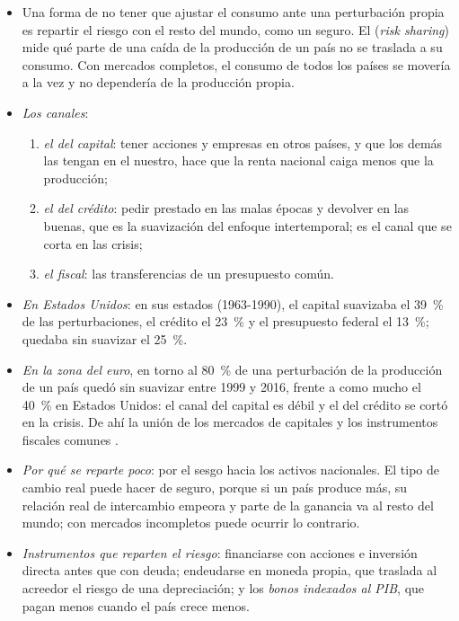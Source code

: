 \documentclass[11pt]{article}
\begin{document}
\begin{itemize}
\item Una forma de no tener que ajustar el consumo ante una perturbación propia es repartir el riesgo con el resto del mundo, como un seguro. El  (\emph{risk sharing}) mide qué parte de una caída de la producción de un país no se traslada a su consumo. Con mercados completos, el consumo de todos los países se movería a la vez y no dependería de la producción propia.
\item \emph{Los canales}\nocite{AsdrubaliSorensenYosha1996}:
  \begin{enumerate}
  \item \emph{el del capital}: tener acciones y empresas en otros países, y que los demás las tengan en el nuestro, hace que la renta nacional caiga menos que la producción;
  \item \emph{el del crédito}: pedir prestado en las malas épocas y devolver en las buenas, que es la suavización del enfoque intertemporal; es el canal que se corta en las crisis;
  \item \emph{el fiscal}: las transferencias de un presupuesto común.
  \end{enumerate}
\item \emph{En Estados Unidos}: en sus estados (1963-1990), el capital suavizaba el 39~\% de las perturbaciones, el crédito el 23~\% y el presupuesto federal el 13~\%; quedaba sin suavizar el 25~\%\nocite{AsdrubaliSorensenYosha1996}.
\item \emph{En la zona del euro}, en torno al 80~\% de una perturbación de la producción de un país quedó sin suavizar entre 1999 y 2016, frente a como mucho el 40~\% en Estados Unidos: el canal del capital es débil y el del crédito se cortó en la crisis\nocite{CimadomoEtAl2018Risk}. De ahí la unión de los mercados de capitales  y los instrumentos fiscales comunes .
\item \emph{Por qué se reparte poco}: por el sesgo hacia los activos nacionales\nocite{Lewis1999}. El tipo de cambio real puede hacer de seguro, porque si un país produce más, su relación real de intercambio empeora y parte de la ganancia va al resto del mundo; con mercados incompletos puede ocurrir lo contrario\nocite{CorsettiDedolaLeduc2008,CorsettiDedolaLeduc2004}.
\item \emph{Instrumentos que reparten el riesgo}: financiarse con acciones e inversión directa antes que con deuda; endeudarse en moneda propia, que traslada al acreedor el riesgo de una depreciación; y los \emph{bonos indexados al PIB}, que pagan menos cuando el país crece menos\nocite{Shiller1993Macro,BorenszteinMauro2004}.
\end{itemize}
\end{document}
